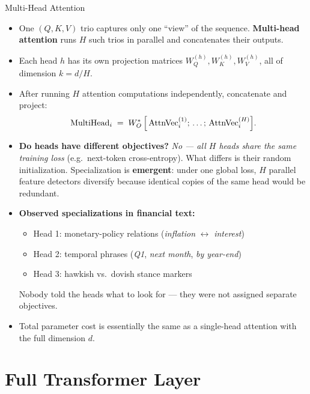 \documentclass[10pt,english,aspectratio=169]{beamer}
\begin{document}
\begin{frame}{Multi-Head Attention}
\begin{itemize}
\item One $(Q, K, V)$ trio captures only one ``view'' of the sequence. \textbf{Multi-head attention} runs $H$ such trios in parallel and concatenates their outputs.

\medskip
\item Each head $h$ has its own projection matrices $W_{Q}^{(h)}, W_{K}^{(h)}, W_{V}^{(h)}$, all of dimension $k = d/H$.

\medskip
\item After running $H$ attention computations independently, concatenate and project:
\[
   \text{MultiHead}_{i} \;=\; W_{O}^{*}\,\Bigl[\,\text{AttnVec}_{i}^{(1)};\,\ldots;\,\text{AttnVec}_{i}^{(H)}\Bigr].
\]

\medskip
\item \textbf{Do heads have different objectives?} \emph{No --- all $H$ heads share the same training loss} (e.g.\ next-token cross-entropy). What differs is their random initialization. Specialization is \textbf{emergent}: under one global loss, $H$ parallel feature detectors diversify because identical copies of the same head would be redundant.

\medskip
\item \textbf{Observed specializations in financial text:}
\begin{itemize}
    \item Head 1: monetary-policy relations (\emph{inflation} $\leftrightarrow$ \emph{interest})
    \item Head 2: temporal phrases (\emph{Q1}, \emph{next month}, \emph{by year-end})
    \item Head 3: hawkish vs.\ dovish stance markers
\end{itemize}
Nobody told the heads what to look for --- they were not assigned separate objectives.

\medskip
\item Total parameter cost is essentially the same as a single-head attention with the full dimension $d$.
\end{itemize}
\end{frame}

\section{Full Transformer Layer}
\end{document}
